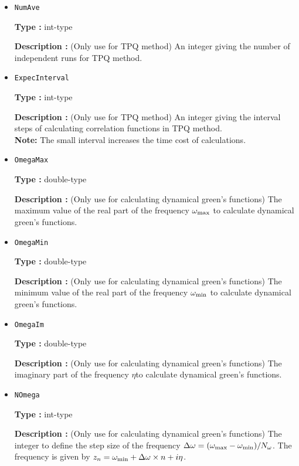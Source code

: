 \begin{itemize}
{\bf Type :} double-type

{\bf Description :} (Only use for TPQ method) An integer giving $l$ of $l-\hat{H}/N_{s}$ used in TPQ method.
 
\item \verb|NumAve|

{\bf Type :} int-type

{\bf Description :} (Only use for TPQ method) An integer giving the number of independent runs for TPQ method. 

\item \verb|ExpecInterval|

{\bf Type :} int-type

{\bf Description :} (Only use for TPQ method) An integer giving the interval steps of calculating correlation functions in TPQ method.\\ 
{\bf Note:} The small interval increases the time cost of calculations.
 
 \item \verb|OmegaMax|

{\bf Type :} double-type

{\bf Description :} {(Only use for calculating dynamical green's functions) The maximum value of the real part of the frequency $\omega_{\rm max}$ to calculate dynamical green's functions.}

\item \verb|OmegaMin|

{\bf Type :} double-type

{\bf Description :} {(Only use for calculating dynamical green's functions) The minimum value of the real part of the frequency $\omega_{\rm min}$ to calculate dynamical green's functions.}

\item \verb|OmegaIm|

{\bf Type :} double-type

{\bf Description :} {(Only use for calculating dynamical green's functions) The imaginary part of the frequency $\eta$to calculate dynamical green's functions.}
 
\item \verb|NOmega|

{\bf Type :} int-type

{\bf Description :} {(Only use for calculating dynamical green's functions) The integer to define the step size of the frequency $\Delta \omega = (\omega_{\rm max}-\omega_{\rm min} )/N_{\omega}$. The frequency is given by $z_n=\omega_{\rm min} + \Delta \omega \times n+ i\eta$.} 
 
 \end{itemize}



